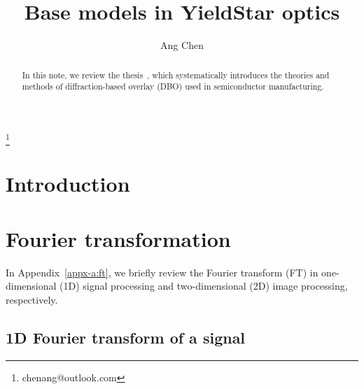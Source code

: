 \documentclass[pra,superscriptaddress,reprint]{revtex4-1}
\begin{document}
\title{\Large Base models in YieldStar optics}

\author{Ang Chen}
\thanks{chenang@outlook.com}


\begin{abstract}
In this note, we review the thesis~\cite{swinkels2021spectral}, which systematically introduces the theories and methods
of diffraction-based overlay (DBO) used in semiconductor manufacturing.
\end{abstract}

\maketitle


\section{Introduction~\label{sec:1}}




\appendix

\section{Fourier transformation~\label{appx-a:ft}}
In Appendix~\ref{appx-a:ft}, we briefly review the Fourier transform (FT) in one-dimensional (1D) signal processing and
two-dimensional (2D) image processing, respectively.
\subsection{1D Fourier transform of a signal~\label{appx-a1:1dft}}
\end{document}
